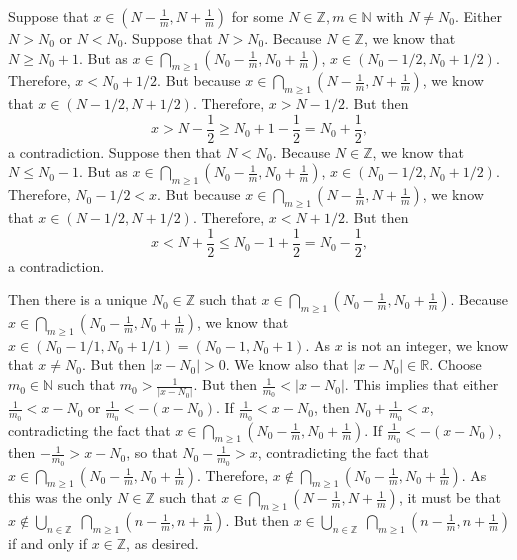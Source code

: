 \documentclass[11pt,letterpaper]{article}
\begin{document}
\begin{enumerate}[(a)]
Suppose that $x \in \left(N - \frac{1}{m}, N + \frac{1}{m} \right)$ for some $N \in \mathbb{Z}, m \in \mathbb{N}$ with $N \neq N_0$. Either $N > N_0$ or $N < N_0$. Suppose that $N > N_0$. Because $N \in \mathbb{Z}$, we know that $N \geq N_0 + 1$. But as $x \in \bigcap_{m \geq 1} \left( N_0 - \frac{1}{m}, N_0 + \frac{1}{m} \right)$, $x \in (N_0 - 1/2, N_0 + 1/2)$. Therefore, $x < N_0 + 1/2$. But because $x \in \bigcap_{m \geq 1} \left( N - \frac{1}{m}, N + \frac{1}{m} \right)$, we know that $x \in (N - 1/2, N + 1/2)$. Therefore, $x > N - 1/2$. But then 
	\[
	x > N - \frac{1}{2} \geq N_0 + 1 - \frac{1}{2} = N_0 + \frac{1}{2},
	\]
a contradiction. Suppose then that $N < N_0$. Because $N \in \mathbb{Z}$, we know that $N \leq N_0 - 1$. But as $x \in \bigcap_{m \geq 1} \left( N_0 - \frac{1}{m}, N_0 + \frac{1}{m} \right)$, $x \in (N_0 - 1/2, N_0 + 1/2)$. Therefore, $N_0 - 1/2 < x$. But because $x \in \bigcap_{m \geq 1} \left( N - \frac{1}{m}, N + \frac{1}{m} \right)$, we know that $x \in (N - 1/2, N + 1/2)$. Therefore, $x < N + 1/2$. But then 
	\[
	x < N + \frac{1}{2} \leq N_0 - 1 + \frac{1}{2}= N_0 - \frac{1}{2},
	\]
a contradiction. 

Then there is a unique $N_0 \in \mathbb{Z}$ such that $x \in \bigcap_{m \geq 1} \left( N_0 - \frac{1}{m}, N_0 + \frac{1}{m} \right)$. Because $x \in \bigcap_{m \geq 1} \left( N_0 - \frac{1}{m}, N_0 + \frac{1}{m} \right)$, we know that $x \in (N_0 - 1/1, N_0 + 1/1)= (N_0 - 1, N_0 + 1)$. As $x$ is not an integer, we know that $x \neq N_0$. But then $|x - N_0| > 0$. We know also that $|x - N_0| \in \mathbb{R}$. Choose $m_0 \in \mathbb{N}$ such that $m_0 > \frac{1}{|x - N_0|}$. But then $\frac{1}{m_0} < | x - N_0|$. This implies that either $\frac{1}{m_0} < x - N_0$ or $\frac{1}{m_0} < -(x - N_0)$. If $\frac{1}{m_0} < x - N_0$, then $N_0 + \frac{1}{m_0} < x$, contradicting the fact that $x \in \bigcap_{m \geq 1} \left( N_0 - \frac{1}{m}, N_0 + \frac{1}{m} \right)$. If $\frac{1}{m_0} < -(x - N_0)$, then $-\frac{1}{m_0} > x - N_0$, so that $N_0 - \frac{1}{m_0} > x$, contradicting the fact that $x \in \bigcap_{m \geq 1} \left( N_0 - \frac{1}{m}, N_0 + \frac{1}{m} \right)$. Therefore, $x \notin \bigcap_{m \geq 1} \left( N_0 - \frac{1}{m}, N_0 + \frac{1}{m} \right)$. As this was the only $N \in \mathbb{Z}$ such that $x \in \bigcap_{m \geq 1} \left( N - \frac{1}{m}, N + \frac{1}{m} \right)$, it must be that $x \notin \bigcup_{n \in \mathbb{Z}}\; \bigcap_{m \geq 1} \left( n - \frac{1}{m}, n + \frac{1}{m} \right)$. But then $x \in \bigcup_{n \in \mathbb{Z}}\; \bigcap_{m \geq 1} \left( n - \frac{1}{m}, n + \frac{1}{m} \right)$ if and only if $x \in \mathbb{Z}$, as desired. 
\end{enumerate}
\end{document}
